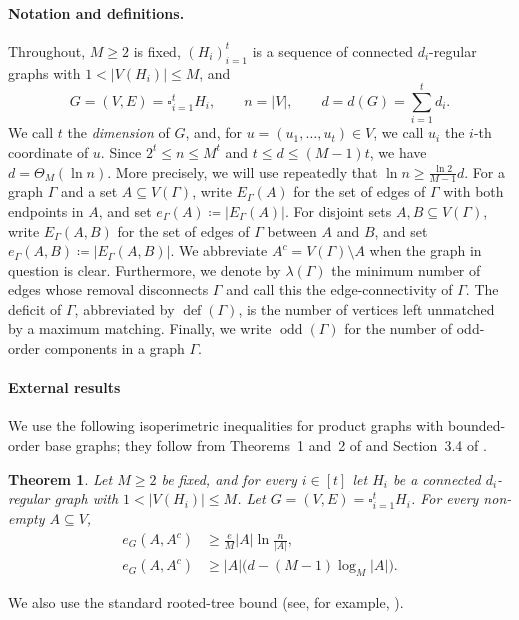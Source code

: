 \documentclass[notitlepage]{scrartcl}
\newtheorem{thm}{Theorem}[section]
\newcommand{\defi}{\operatorname{def}}
\newcommand{\odd}{\operatorname{odd}}
\begin{document}
\paragraph{Notation and definitions.}
Throughout, $M\ge2$ is fixed, $(H_i)_{i=1}^t$ is a sequence of connected $d_i$-regular graphs with $1<|V(H_i)|\le M$, and
\[
  G=(V,E)=\square_{i=1}^tH_i,
  \qquad n=|V|,
  \qquad d=d(G)=\sum_{i=1}^td_i.
\]
We call $t$ the \emph{dimension} of $G$, and, for $u=(u_1,\ldots,u_t)\in V$, we call $u_i$ the $i$-th coordinate of $u$.
Since $2^t\le n\le M^t$ and $t\le d\le(M-1)t$, we have $d=\Theta_M(\ln n)$. More precisely, we will use repeatedly that $\ln n \geq \frac{\ln 2}{M-1} d$.
For a graph $\Gamma$ and a set $A\subseteq V(\Gamma)$, write $E_\Gamma(A)$ for the set of edges of $\Gamma$ with both endpoints in $A$, and set $e_\Gamma(A)\coloneqq |E_\Gamma(A)|$.
For disjoint sets $A,B\subseteq V(\Gamma)$, write $E_\Gamma(A,B)$ for the set of edges of $\Gamma$ between $A$ and $B$, and set $e_\Gamma(A,B)\coloneqq |E_\Gamma(A,B)|$.
We abbreviate $A^c=V(\Gamma)\setminus A$ when the graph in question is clear. Furthermore, we denote by $\lambda(\Gamma)$ the minimum number of edges whose removal disconnects $\Gamma$ and call this the edge-connectivity of $\Gamma$. The deficit of $\Gamma$, abbreviated by $\defi(\Gamma)$, is the number of vertices left unmatched by a maximum matching.
Finally, we write $\odd(\Gamma)$ for the number of odd-order components in a graph $\Gamma$.

\paragraph{External results}
We use the following isoperimetric inequalities for product graphs with bounded-order base graphs; they follow from Theorems~1 and~2 of \cite{DEKK24} and Section~3.4 of \cite{DS24}.

\begin{thm}\label{th:expansion}
Let $M\ge2$ be fixed, and for every $i\in[t]$ let $H_i$ be a connected $d_i$-regular graph with $1<|V(H_i)|\le M$.
Let $G=(V, E)=\square_{i=1}^tH_i$. For every non-empty $A\subseteq V$,
\begin{align}
  e_G(A,A^c)&\ge \frac{e}{M}|A|\ln\frac{n}{|A|},\label{eq:expansion-log}\\
  e_G(A,A^c)&\ge |A|\bigl(d-(M-1)\log_M|A|\bigr).\label{eq:expansion-local}
\end{align}
\end{thm}

We also use the standard rooted-tree bound (see, for example, \cite[Lemma~2]{BFM98}).
\end{document}

